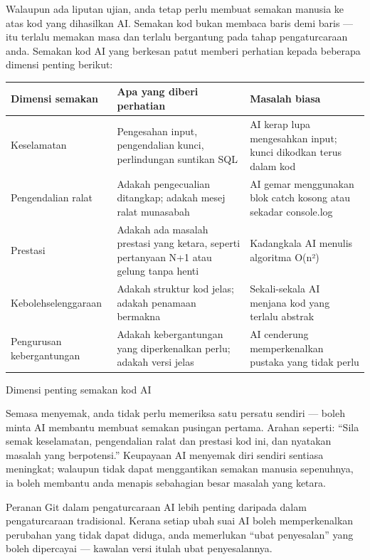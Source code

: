 
Walaupun ada liputan ujian, anda tetap perlu membuat semakan manusia ke atas kod yang dihasilkan AI. Semakan kod bukan membaca baris demi baris — itu terlalu memakan masa dan terlalu bergantung pada tahap pengaturcaraan anda. Semakan kod AI yang berkesan patut memberi perhatian kepada beberapa dimensi penting berikut:

\begin{center}
\begin{tabularx}{\linewidth}{|X|X|X|}
\hline
\textbf{Dimensi semakan} & \textbf{Apa yang diberi perhatian} & \textbf{Masalah biasa} \tabularnewline
\hline
Keselamatan & Pengesahan input, pengendalian kunci, perlindungan suntikan SQL & AI kerap lupa mengesahkan input; kunci dikodkan terus dalam kod \tabularnewline
Pengendalian ralat & Adakah pengecualian ditangkap; adakah mesej ralat munasabah & AI gemar menggunakan blok catch kosong atau sekadar console.log \tabularnewline
Prestasi & Adakah ada masalah prestasi yang ketara, seperti pertanyaan N+1 atau gelung tanpa henti & Kadangkala AI menulis algoritma O(n²) \tabularnewline
Kebolehselenggaraan & Adakah struktur kod jelas; adakah penamaan bermakna & Sekali-sekala AI menjana kod yang terlalu abstrak \tabularnewline
Pengurusan kebergantungan & Adakah kebergantungan yang diperkenalkan perlu; adakah versi jelas & AI cenderung memperkenalkan pustaka yang tidak perlu \tabularnewline
\hline
\end{tabularx}
\end{center}

\begin{center}\small\color{gray}Dimensi penting semakan kod AI\end{center}

Semasa menyemak, anda tidak perlu memeriksa satu persatu sendiri — boleh minta AI membantu membuat semakan pusingan pertama. Arahan seperti: “Sila semak keselamatan, pengendalian ralat dan prestasi kod ini, dan nyatakan masalah yang berpotensi.” Keupayaan AI menyemak diri sendiri sentiasa meningkat; walaupun tidak dapat menggantikan semakan manusia sepenuhnya, ia boleh membantu anda menapis sebahagian besar masalah yang ketara.


Peranan Git dalam pengaturcaraan AI lebih penting daripada dalam pengaturcaraan tradisional. Kerana setiap ubah suai AI boleh memperkenalkan perubahan yang tidak dapat diduga, anda memerlukan “ubat penyesalan” yang boleh dipercayai — kawalan versi itulah ubat penyesalannya.

